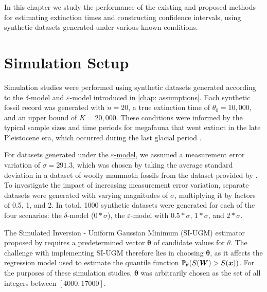 
In this chapter we study the performance of the existing and proposed methods for estimating extinction times and constructing confidence intervals, using synthetic datasets generated under various known conditions.

\section{Simulation Setup}

Simulation studies were performed using synthetic datasets generated according to the \hyperref[model: no-measurement-error]{$\delta$-model} and \hyperref[model: measurement-error]{$\varepsilon$-model} introduced in \autoref{chap: assumptions}. Each synthetic fossil record was generated with $n=20$, a true extinction time of $\theta_0 = 10,000$, and an upper bound of $K = 20,000$. These conditions were informed by the typical sample sizes and time periods for megafauna that went extinct in the late Pleistocene era, which occurred during the last glacial period \cite{Cooper2015}.

For datasets generated under the \hyperref[model: measurement-error]{$\varepsilon$-model}, we assumed a measurement error variation of $\sigma = 291.3$, which was chosen by taking the average standard deviation in a dataset of woolly mammoth fossils from the dataset provided by \citet{Cooper2015}. To investigate the impact of increasing measurement error variation, separate datasets were generated with varying magnitudes of $\sigma$, multiplying it by factors of 0.5, 1, and 2. In total, 1000 synthetic datasets were generated for each of the four scenarios: the $\delta$-model ($0*\sigma$), the $\varepsilon$-model with $0.5*\sigma$, $1*\sigma$, and $2*\sigma$. 

The Simulated Inversion - Uniform Gaussian Minimum (SI-UGM) estimator proposed by \citet{Huang2019} requires a predetermined vector $\bm{\theta}$ of candidate values for $\theta$. The challenge with implementing SI-UGM therefore lies in choosing $\bm{\theta}$, as it affects the regression model used to estimate the quantile function $\mathbb{P}_\theta(S(\bm{W}) > S(\bm{x}))$. For the purposes of these simulation studies, $\bm{\theta}$ was arbitrarily chosen as the set of all integers between $[4000, 17000]$.

